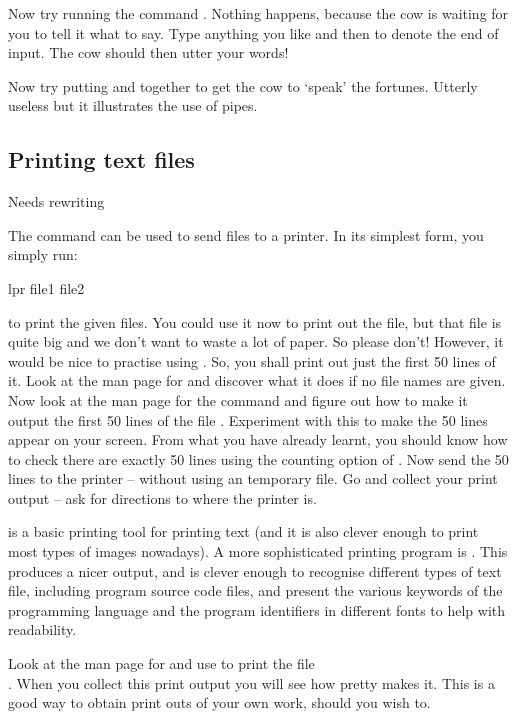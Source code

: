 Now try running the command . Nothing happens, because the cow is waiting for you to tell it what to say. Type anything you like and then  to denote the end of input. The cow should then utter your words!

Now try putting  and  together to get the cow to `speak' the fortunes. Utterly useless but it illustrates the use of pipes.




\subsection{Printing text files}

\begin{note}
  Needs rewriting
\end{note}

The command  can be used to send files to a printer. In its
simplest form, you simply run:
%
\begin{ttoutenv}
  lpr file1 file2
\end{ttoutenv}
%
to print the given files. You could use it now to print out the
 file, but that file is quite big and we don't want to waste
a lot of paper. So please don't! However, it would be nice to practise using
. So, you shall print out just the first 50 lines of it. Look at
the man page for  and discover what it does if no file names are
given. Now look at the man page for the command  and figure out
how to make it output the first 50 lines of the file .
Experiment with this to make the 50 lines appear on your screen. From what you
have already learnt, you should know how to check there are exactly 50 lines
using the counting option of . Now send the 50 lines to the
printer -- without using an temporary file. Go and collect your print output
-- ask for directions to where the printer is.
%

 is a basic printing tool for printing text (and it is also
clever enough to print most types of images nowadays). A more sophisticated
printing program is . This produces a nicer output, and is
clever enough to recognise different types of text file, including program
source code files, and present the various keywords of the programming
language and the program identifiers in different fonts to help with
readability.

Look at the man page for  and use  to print the file\\
. When you collect
this print output you will see how pretty  makes it. This is a
good way to obtain print outs of your own work, should you wish to.

